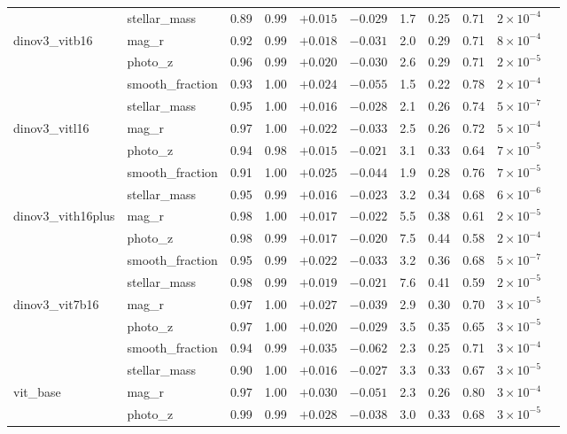 \begin{tabular}{llccccccccc}
 & stellar\_mass & 0.89 & 0.99 & $+0.015$ & $-0.029$ & 1.7 & 0.25 & 0.71 & $2\times 10^{-4}$ \\
\addlinespace[2pt]
dinov3\_vitb16 & mag\_r & 0.92 & 0.99 & $+0.018$ & $-0.031$ & 2.0 & 0.29 & 0.71 & $8\times 10^{-4}$ \\
 & photo\_z & 0.96 & 0.99 & $+0.020$ & $-0.030$ & 2.6 & 0.29 & 0.71 & $2\times 10^{-5}$ \\
 & smooth\_fraction & 0.93 & 1.00 & $+0.024$ & $-0.055$ & 1.5 & 0.22 & 0.78 & $2\times 10^{-4}$ \\
 & stellar\_mass & 0.95 & 1.00 & $+0.016$ & $-0.028$ & 2.1 & 0.26 & 0.74 & $5\times 10^{-7}$ \\
\addlinespace[2pt]
dinov3\_vitl16 & mag\_r & 0.97 & 1.00 & $+0.022$ & $-0.033$ & 2.5 & 0.26 & 0.72 & $5\times 10^{-4}$ \\
 & photo\_z & 0.94 & 0.98 & $+0.015$ & $-0.021$ & 3.1 & 0.33 & 0.64 & $7\times 10^{-5}$ \\
 & smooth\_fraction & 0.91 & 1.00 & $+0.025$ & $-0.044$ & 1.9 & 0.28 & 0.76 & $7\times 10^{-5}$ \\
 & stellar\_mass & 0.95 & 0.99 & $+0.016$ & $-0.023$ & 3.2 & 0.34 & 0.68 & $6\times 10^{-6}$ \\
\addlinespace[2pt]
dinov3\_vith16plus & mag\_r & 0.98 & 1.00 & $+0.017$ & $-0.022$ & 5.5 & 0.38 & 0.61 & $2\times 10^{-5}$ \\
 & photo\_z & 0.98 & 0.99 & $+0.017$ & $-0.020$ & 7.5 & 0.44 & 0.58 & $2\times 10^{-4}$ \\
 & smooth\_fraction & 0.95 & 0.99 & $+0.022$ & $-0.033$ & 3.2 & 0.36 & 0.68 & $5\times 10^{-7}$ \\
 & stellar\_mass & 0.98 & 0.99 & $+0.019$ & $-0.021$ & 7.6 & 0.41 & 0.59 & $2\times 10^{-5}$ \\
\addlinespace[2pt]
dinov3\_vit7b16 & mag\_r & 0.97 & 1.00 & $+0.027$ & $-0.039$ & 2.9 & 0.30 & 0.70 & $3\times 10^{-5}$ \\
 & photo\_z & 0.97 & 1.00 & $+0.020$ & $-0.029$ & 3.5 & 0.35 & 0.65 & $3\times 10^{-5}$ \\
 & smooth\_fraction & 0.94 & 0.99 & $+0.035$ & $-0.062$ & 2.3 & 0.25 & 0.71 & $3\times 10^{-4}$ \\
 & stellar\_mass & 0.90 & 1.00 & $+0.016$ & $-0.027$ & 3.3 & 0.33 & 0.67 & $3\times 10^{-5}$ \\
\addlinespace[2pt]
vit\_base & mag\_r & 0.97 & 1.00 & $+0.030$ & $-0.051$ & 2.3 & 0.26 & 0.80 & $3\times 10^{-4}$ \\
 & photo\_z & 0.99 & 0.99 & $+0.028$ & $-0.038$ & 3.0 & 0.33 & 0.68 & $3\times 10^{-5}$ \\

\end{tabular}
